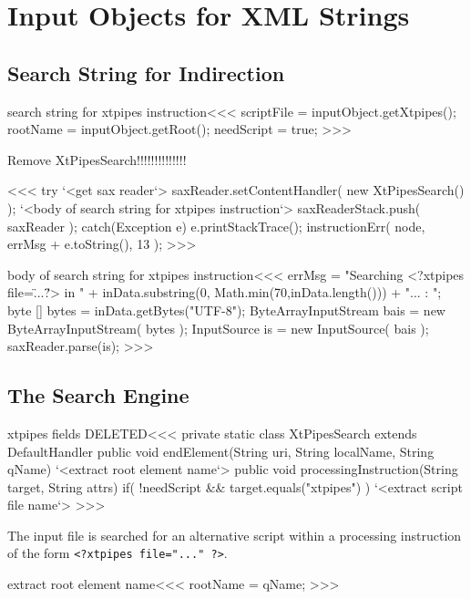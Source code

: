 \documentclass{article}
\begin{document}
\section{Input Objects for XML Strings}



\subsection{Search String for Indirection}


\<search string for xtpipes instruction\><<<
scriptFile = inputObject.getXtpipes();
rootName = inputObject.getRoot();
needScript = true;
>>>


Remove XtPipesSearch!!!!!!!!!!!!!!

\<\><<<
try{
       `<get sax reader`>
       saxReader.setContentHandler( new XtPipesSearch() );
      `<body of search string for xtpipes instruction`>
       saxReaderStack.push( saxReader );
} catch(Exception e){
e.printStackTrace();
   instructionErr( node, errMsg + e.toString(), 13 );
}
>>>

\<body of search string for xtpipes instruction\><<<
errMsg = "Searching <?xtpipes file=\"...\"?>  in "
        + inData.substring(0, Math.min(70,inData.length()))
        + "... : ";
byte [] bytes = inData.getBytes("UTF-8");
ByteArrayInputStream bais = new ByteArrayInputStream( bytes );
InputSource is = new InputSource( bais );
saxReader.parse(is);
>>>

\subsection{The Search Engine}



\<xtpipes fields DELETED\><<<
private static class XtPipesSearch extends DefaultHandler {
   public void  endElement(String uri,
                           String localName, String qName){
     `<extract root element name`>
   }
   public void processingInstruction(String target, String attrs) {
     if( !needScript && target.equals("xtpipes") ){
        `<extract script file name`>
}  } }
>>>


The input file is
searched for an alternative script within a processing instruction of
the form \verb+<?xtpipes file="..." ?>+.


\<extract root element name\><<<
rootName = qName;
>>>
\end{document}
